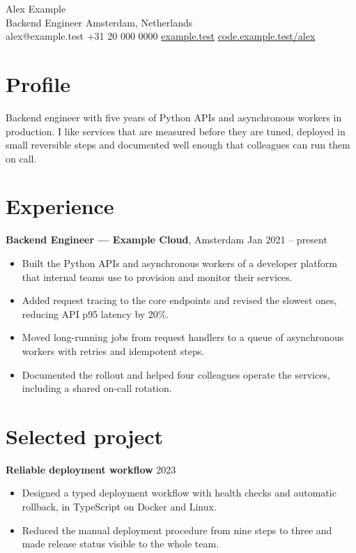 \documentclass[10pt,a4paper]{article}
\begin{document}
{\LARGE Alex Example}\\[3pt]
Backend Engineer \hfill Amsterdam, Netherlands\\
alex@example.test \textperiodcentered{} +31 20 000 0000 \hfill
\href{https://example.test}{example.test} \textperiodcentered{}
\href{https://code.example.test/alex}{code.example.test/alex}

\section*{Profile}
Backend engineer with five years of Python APIs and asynchronous workers in
production. I like services that are measured before they are tuned, deployed
in small reversible steps and documented well enough that colleagues can run
them on call.

\section*{Experience}
\textbf{Backend Engineer --- Example Cloud}, Amsterdam \hfill Jan 2021 -- present
\begin{itemize}
  \item Built the Python APIs and asynchronous workers of a developer platform
    that internal teams use to provision and monitor their services.
  \item Added request tracing to the core endpoints and revised the slowest
    ones, reducing API p95 latency by 20\%.
  \item Moved long-running jobs from request handlers to a queue of
    asynchronous workers with retries and idempotent steps.
  \item Documented the rollout and helped four colleagues operate the services,
    including a shared on-call rotation.
\end{itemize}

\section*{Selected project}
\textbf{Reliable deployment workflow} \hfill 2023
\begin{itemize}
  \item Designed a typed deployment workflow with health checks and automatic
    rollback, in TypeScript on Docker and Linux.
  \item Reduced the manual deployment procedure from nine steps to three and
    made release status visible to the whole team.
\end{itemize}
\end{document}
